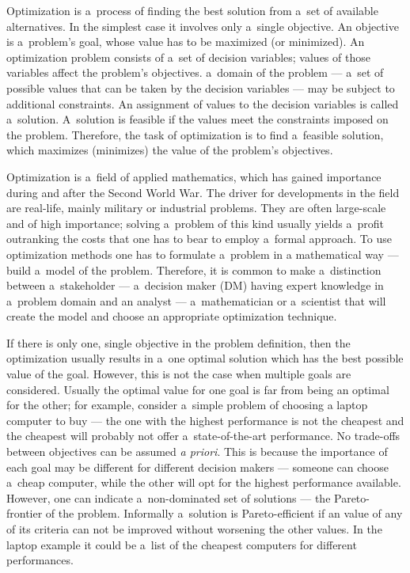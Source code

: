 Optimization is a~process of finding the best solution from a~set of available
alternatives. In the simplest case it involves only a~single objective. An
objective is a~problem's goal, whose value has to be maximized (or
minimized). An optimization problem consists of a~set of decision variables;
values of those variables affect the problem's objectives. a~domain of the
problem --- a~set of possible values that can be taken by the decision
variables --- may be subject to additional constraints. An assignment of
values to the decision variables is called a~solution. A~solution is feasible
if the values meet the constraints imposed on the problem. Therefore, the task
of optimization is to find a~feasible solution, which maximizes (minimizes)
the value of the problem's objectives.

Optimization is a~field of applied mathematics, which has gained importance
during and after the Second World War. The driver for developments in the
field are real-life, mainly military or industrial problems. They are often
large-scale and of high importance; solving a~problem of this kind usually
yields a~profit outranking the costs that one has to bear to employ a~formal
approach. To use optimization methods one has to formulate a~problem in a
mathematical way --- build a~model of the problem. Therefore, it is common to
make a~distinction between a~stakeholder --- a~decision maker (DM) having
expert knowledge in a~problem domain and an analyst --- a~mathematician or
a~scientist that will create the model and choose an appropriate optimization
technique.

If there is only one, single objective in the problem definition, then the
optimization usually results in a~one optimal solution which has the best
possible value of the goal. However, this is not the case when multiple goals
are considered. Usually the optimal value for one goal is far from being an
optimal for the other; for example, consider a~simple problem of choosing a
laptop computer to buy --- the one with the highest performance is not the
cheapest and the cheapest will probably not offer a~state-of-the-art
performance. No trade-offs between objectives can be assumed \textit{a
  priori}. This is because the importance of each goal may be different for
different decision makers --- someone can choose a~cheap computer, while the
other will opt for the highest performance available. However, one can
indicate a~non-dominated set of solutions --- the Pareto-frontier of the
problem. Informally a~solution is Pareto-efficient if an value of any of its
criteria can not be improved without worsening the other values. In the laptop
example it could be a~list of the cheapest computers for different
performances.

